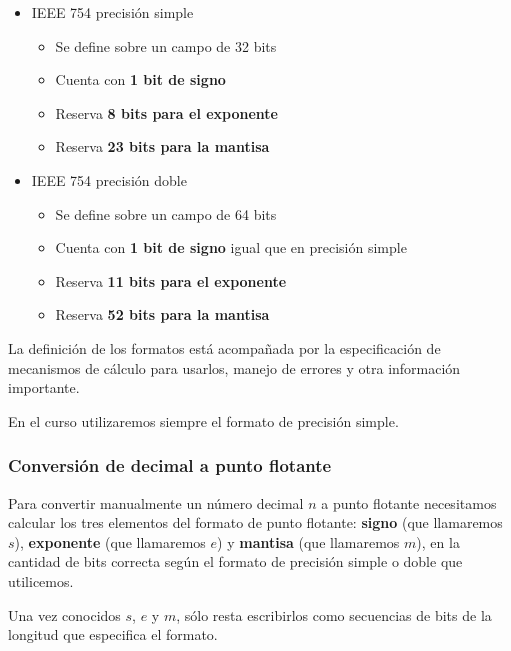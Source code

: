 \documentclass[spanish,A4,]{article}
\begin{document}
\begin{itemize}
\itemsep1pt\parskip0pt
\item
  IEEE 754 precisión simple

  \begin{itemize}
  \itemsep1pt\parskip0pt
  \item
    Se define sobre un campo de 32 bits
  \item
    Cuenta con \textbf{1 bit de signo}
  \item
    Reserva \textbf{8 bits para el exponente}
  \item
    Reserva \textbf{23 bits para la mantisa}
  \end{itemize}
\item
  IEEE 754 precisión doble

  \begin{itemize}
  \itemsep1pt\parskip0pt
  \item
    Se define sobre un campo de 64 bits
  \item
    Cuenta con \textbf{1 bit de signo} igual que en precisión simple
  \item
    Reserva \textbf{11 bits para el exponente}
  \item
    Reserva \textbf{52 bits para la mantisa}
  \end{itemize}
\end{itemize}

La definición de los formatos está acompañada por la especificación de
mecanismos de cálculo para usarlos, manejo de errores y otra información
importante.

En el curso utilizaremos siempre el formato de precisión simple.

\subsubsection{Conversión de decimal a punto
flotante}\label{conversiuxf3n-de-decimal-a-punto-flotante}

Para convertir manualmente un número decimal $n$ a punto flotante
necesitamos calcular los tres elementos del formato de punto flotante:
\textbf{signo} (que llamaremos $s$), \textbf{exponente} (que llamaremos
$e$) y \textbf{mantisa} (que llamaremos $m$), en la cantidad de bits
correcta según el formato de precisión simple o doble que utilicemos.

Una vez conocidos $s$, $e$ y $m$, sólo resta escribirlos como secuencias
de bits de la longitud que especifica el formato.
\end{document}
